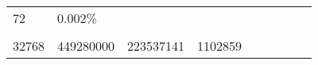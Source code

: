 \documentclass[11pt]{article}
\begin{document}
\begin{longtable}[]{@{}lllllllll@{}}
\begin{minipage}[t]{0.09\columnwidth}
72\strut
\end{minipage} & \begin{minipage}[t]{0.09\columnwidth}\raggedright\strut
0.002\%\strut
\end{minipage} & \begin{minipage}[t]{0.06\columnwidth}\raggedright\strut
\strut
\end{minipage}\tabularnewline
\begin{minipage}[t]{0.12\columnwidth}\raggedright\strut
\strut
\end{minipage} & \begin{minipage}[t]{0.09\columnwidth}\raggedright\strut
\strut
\end{minipage} & \begin{minipage}[t]{0.07\columnwidth}\raggedright\strut
\strut
\end{minipage} & \begin{minipage}[t]{0.08\columnwidth}\raggedright\strut
\strut
\end{minipage} & \begin{minipage}[t]{0.08\columnwidth}\raggedright\strut
\strut
\end{minipage} & \begin{minipage}[t]{0.08\columnwidth}\raggedright\strut
\strut
\end{minipage} & \begin{minipage}[t]{0.09\columnwidth}\raggedright\strut
\strut
\end{minipage} & \begin{minipage}[t]{0.09\columnwidth}\raggedright\strut
\strut
\end{minipage} & \begin{minipage}[t]{0.06\columnwidth}\raggedright\strut
\strut
\end{minipage}\tabularnewline
\begin{minipage}[t]{0.12\columnwidth}\raggedright\strut
32768\strut
\end{minipage} & \begin{minipage}[t]{0.09\columnwidth}\raggedright\strut
449280000\strut
\end{minipage} & \begin{minipage}[t]{0.07\columnwidth}\raggedright\strut
223537141\strut
\end{minipage} & \begin{minipage}[t]{0.08\columnwidth}\raggedright\strut
1102859\strut
\end{minipage} & \begin{minipage}[t]{0.08\columnwidth}\raggedright\strut

\end{minipage}
\end{longtable}
\end{document}
